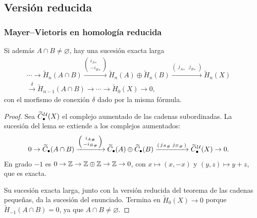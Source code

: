 \subsection{Versión reducida}

\begin{frame}[allowframebreaks]
  \frametitle{Mayer--Vietoris en homología reducida}

  \begin{theorem}
    Si además $A\cap B\neq\varnothing$, hay una sucesión exacta larga
    \begin{multline*}
      \cdots\to\widetilde{H}_n(A\cap B)\xrightarrow{\left(\begin{smallmatrix}{i_A}_*\\-{i_B}_*\end{smallmatrix}\right)}
      \widetilde{H}_n(A)\oplus\widetilde{H}_n(B)
      \xrightarrow{\left(\begin{smallmatrix}{j_A}_* & {j_B}_*\end{smallmatrix}\right)}\widetilde{H}_n(X)\\
      \xrightarrow{\ \delta\ }\widetilde{H}_{n-1}(A\cap B)\to\cdots
      \to\widetilde{H}_0(X)\to0,
    \end{multline*}
    con el morfismo de conexión $\delta$ dado por la misma fórmula.
  \end{theorem}

  \framebreak

  \begin{proof}
    Sea $\widetilde{C}^{\mkern2mu\mathcal{U}}_\bullet(X)$ el complejo aumentado
    de las cadenas subordinadas. La sucesión del lema se extiende a los
    complejos aumentados:
    \[
      0\to\widetilde{C}_\bullet(A\cap B)\xrightarrow{\left(\begin{smallmatrix}{i_A}_\#\\-{i_B}_\#\end{smallmatrix}\right)}
      \widetilde{C}_\bullet(A)\oplus\widetilde{C}_\bullet(B)
      \xrightarrow{\left(\begin{smallmatrix}{j_A}_\# & {j_B}_\#\end{smallmatrix}\right)}\widetilde{C}^{\mkern2mu\mathcal{U}}_\bullet(X)\to0.
    \]
    En grado $-1$ es $0\to\mathbb{Z}\to\mathbb{Z}\oplus\mathbb{Z}\to\mathbb{Z}\to0$, con $x\mapsto(x,-x)$ y
    $(y,z)\mapsto y+z$, que es exacta.

    \medskip

    Su sucesión exacta larga, junto con la versión reducida del teorema de
    las cadenas pequeñas, da la sucesión del enunciado. Termina en
    $\widetilde{H}_0(X)\to0$ porque
    $\widetilde{H}_{-1}(A\cap B)=0$, ya que $A\cap B\neq\varnothing$.
  \end{proof}
\end{frame}
